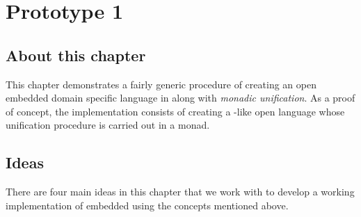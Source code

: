 \documentclass[thesis-solanki.tex]{subfiles}
\begin{document}
\chapter{Prototype 1}{\label{proto1}}



\section{About this chapter}

This chapter demonstrates a fairly generic procedure of creating an open embedded domain specific language in
 along with \textit{monadic unification}.
As a proof of concept, the implementation consists of creating a
-like open language whose unification procedure is
carried out in a monad.


\section{Ideas}
There are four main ideas in this chapter
that we work with to develop a working implementation of embedded 
using the concepts mentioned above.
\end{document}
